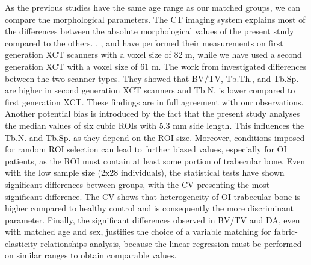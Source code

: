 \documentclass[a4paper,fleqn]{DC_ArtStyle}
\begin{document}
	As the previous studies \cite{Folkestad2012,Kocijan2015,Rolvien2018} have the same age range as our matched groups, we can compare the morphological parameters. The CT imaging system explains most of the differences between the absolute morphological values of the present study compared to the others. \citeauthor{Folkestad2012}\cite{Folkestad2012}, \citeauthor{Kocijan2015}\cite{Kocijan2015}, and \citeauthor{Rolvien2018}\cite{Rolvien2018} have performed their measurements on first generation XCT scanners with a voxel size of 82 \si{\micro}m, while we have used a second generation XCT with a voxel size of 61 \si{\micro}m. The work from \citeauthor{Agarwal2016}\cite{Agarwal2016} investigated differences between the two scanner types. They showed that BV/TV, Tb.Th., and Tb.Sp. are higher in second generation XCT scanners and Tb.N. is lower compared to first generation XCT. These findings are in full agreement with our observations. Another potential bias is introduced by the fact that the present study analyses the median values of six cubic ROIs with 5.3 mm side length. This influences the Tb.N. and Tb.Sp. as they depend on the ROI size. Moreover, conditions imposed for random ROI selection can lead to further biased values, especially for OI patients, as the ROI must contain at least some portion of trabecular bone. Even with the low sample size (2x28 individuals), the statistical tests have shown significant differences between groups, with the CV presenting the most significant difference. The CV shows that heterogeneity of OI trabecular bone is higher compared to healthy control and is consequently the more discriminant parameter. Finally, the significant differences observed in BV/TV and DA, even with matched age and sex, justifies the choice of a variable matching for fabric-elasticity relationships analysis, because the linear regression must be performed on similar ranges to obtain comparable values. \\
	
\end{document}
